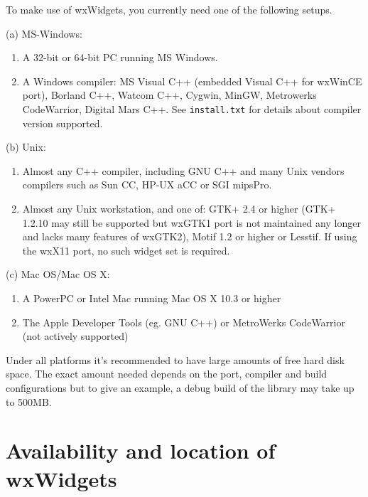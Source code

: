 To make use of wxWidgets, you currently need one of the following setups.

(a) MS-Windows:

\begin{enumerate}\itemsep=0pt
\item A 32-bit or 64-bit PC running MS Windows.
\item A Windows compiler: MS Visual C++ (embedded Visual C++ for wxWinCE
port), Borland C++, Watcom C++, Cygwin, MinGW, Metrowerks CodeWarrior,
Digital Mars C++. See {\tt install.txt} for details about compiler 
version supported.
\end{enumerate}

(b) Unix:

\begin{enumerate}\itemsep=0pt
\item Almost any C++ compiler, including GNU C++ and many Unix vendors
compilers such as Sun CC, HP-UX aCC or SGI mipsPro.
\item Almost any Unix workstation, and one of: GTK+ 2.4 or higher (GTK+ 1.2.10
may still be supported but wxGTK1 port is not maintained any longer and lacks
many features of wxGTK2), Motif 1.2 or higher or Lesstif. If using the wxX11
port, no such widget set is required.
\end{enumerate}

(c) Mac OS/Mac OS X:

\begin{enumerate}\itemsep=0pt
\item A PowerPC or Intel Mac running Mac OS X 10.3 or higher
\item The Apple Developer Tools (eg. GNU C++) or MetroWerks CodeWarrior (not
actively supported)
\end{enumerate}

Under all platforms it's recommended to have large amounts of free hard disk
space. The exact amount needed depends on the port, compiler and build
configurations but to give an example, a debug build of the library may take up
to 500MB.

\section{Availability and location of wxWidgets}\label{where}


